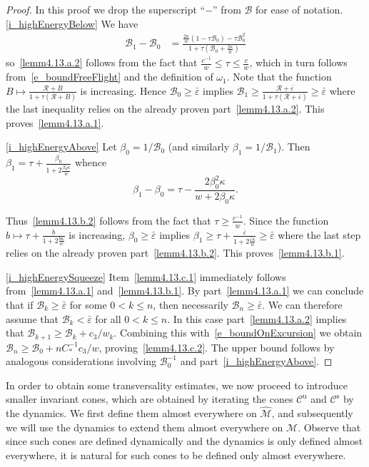 \documentclass[AHL, Unicode, longabstracts,published]{cedram}
\newcommand{\inv}{^{-1}}
\newcommand{\unstable}{\text{u}}
\newcommand{\stable}{\text{s}}
\newcommand{\ifrac}[2]{#1/#2}
\newcommand{\cB}{\mathcal{B}}
\newcommand{\cR}{\mathcal{R}}
\newcommand{\pslope}{\mathcal{B}}
\newcommand{\csp}{\mathcal{M}}
\newcommand{\cone}{\mathcal{C}}
\newcommand{\cspi}{\widehat{\csp}}
\newcommand{\breps}{\bar{\varepsilon}}
\newcommand{\coneu}{\cone^\unstable}
\newcommand{\cones}{\cone^\stable}
\newcommand{\ppPrivate}[2]{#1^{#2}}
\newcommand{\prePrivate}[1]{\ppPrivate{#1}{-}}
\newcommand{\prpslope}{\prePrivate{\pslope}}
\newcommand{\llw}{\stackunder[1.2pt]{$w$}{\rule{.8ex}{.075ex}}}
\newcommand{\law}[1]{\omega_{#1}}
\renewcommand{\prpslope}{\cB}
\renewcommand{\llw}{\law{1}}
\renewcommand{\prpslope}{\cB}
\renewcommand{\prpslope}{\cB}
\begin{document}
\begin{proof}
In this proof we drop the superscript ``$-$'' from $\cB$ for ease of notation. \eqref{i_highEnergyBelow} We have
\begin{align*}
\prpslope_{1}-\prpslope_{0} &=
\frac{\frac{{2}\kappa}{w}\left(1-\tau \prpslope_{0}\right)-\tau
\prpslope_{0}^2}{1+\tau\left(\prpslope_{0}+\frac{2\kappa}{w}\right)}
\end{align*}
so~\eqref{lemm4.13.a.2} follows from the fact that $\frac{c^{-1}}{w}\le\tau\le \frac{c}{w}$, which in turn follows from~\eqref{e_boundFreeFlight} and the definition of $\llw$. Note that the function $B\mapsto \frac{\cR+B}{1+\tau(\cR+B)}$ is increasing. Hence $\prpslope_{0}\geq\breps$ implies $\prpslope_{1}\geq
\frac{\cR+\breps}{1+\tau(\cR+\breps)}\geq\breps $ where the last inequality relies on the already proven part~\eqref{lemm4.13.a.2}. This proves~\eqref{lemm4.13.a.1}.

\eqref{i_highEnergyAbove} Let $\beta_{0}=1/\prpslope_{0}$ (and similarly $\beta_{1}=1/\prpslope_{1}$). Then $\beta_{1}=\tau+\frac{\beta_{0}}{1+2\frac{\beta_{0}
\kappa}{w}}$ whence
\[
\beta_{1}-\beta_{0} =
\tau-\frac{2{\beta_{0}^2 \kappa}}{w+2{\beta_{0} \kappa}}.
\]

Thus~\eqref{lemm4.13.b.2} follows from the fact that $\tau\ge \frac{c^{-1}}{w}$. Since the function $b\mapsto\tau+\frac{b}{1+2\frac{b \kappa}{w}}$ is increasing, $\beta_{0}\geq\breps$ implies $\beta_{1}\geq\tau+\frac{\breps}{1+2\frac{\breps
\kappa}{w}}\geq \breps$ where the last step relies on the already proven part~\eqref{lemm4.13.b.2}. This proves~\eqref{lemm4.13.b.1}.

\eqref{i_highEnergySqueeze} Item~\eqref{lemm4.13.c.1} immediately follows from~\eqref{lemm4.13.a.1} and~\eqref{lemm4.13.b.1}. By part~\eqref{lemm4.13.a.1} we can conclude that if $\prpslope_{k}\ge\breps$ for some $0 < k\le n$, then necessarily $\prpslope_{n}\ge\breps$. We can therefore assume that $\prpslope_{k} < \breps$ for all $0 < k \le n$. In this case part~\eqref{lemm4.13.a.2} implies that $\prpslope_{k+1}\ge\prpslope_{k}+\ifrac{c_3}{w_{k}}$. Combining this with~\eqref{e_boundOnExcursion} we obtain $\prpslope_{n}\ge\prpslope_{0}+\ifrac{n C_{*}^{-1}c_3}{w}$, proving~\eqref{lemm4.13.c.2}. The upper bound follows by analogous considerations involving $\prpslope_{0}\inv$ and part~\eqref{i_highEnergyAbove}.
\end{proof}

In order to obtain some transversality estimates, we now proceed to introduce smaller invariant cones, which are obtained by iterating the cones $\coneu$ and $\cones$ by the dynamics. We first define them almost everywhere on $\cspi$, and subsequently we will use the dynamics to extend them almost everywhere on $\csp$. Observe that since such cones are defined dynamically and the dynamics is only defined almost everywhere, it is natural for such cones to be defined only almost everywhere.
\end{document}
